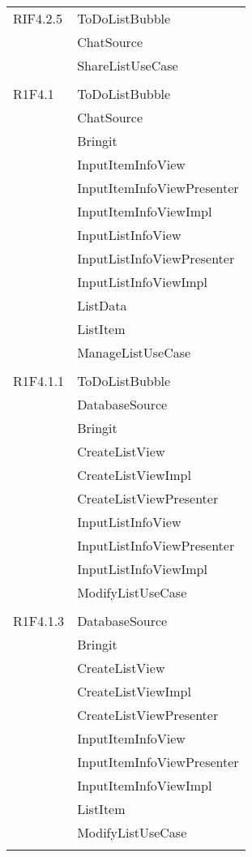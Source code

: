 \begin{center}
\begin{longtable}{|p{7cm}|p{7cm}|}
		RIF4.2.5 & ToDoListBubble \\ & ChatSource \\ & ShareListUseCase \\ & \\ \hline
		R1F4.1 & ToDoListBubble \\ & ChatSource \\ & Bringit \\ & InputItemInfoView \\ & InputItemInfoViewPresenter \\ & InputItemInfoViewImpl \\ & InputListInfoView \\ & InputListInfoViewPresenter \\ & InputListInfoViewImpl \\ & ListData \\ & ListItem \\ & ManageListUseCase \\ & \\ \hline
		R1F4.1.1 & ToDoListBubble \\ & DatabaseSource \\ & Bringit \\ & CreateListView \\ & CreateListViewImpl \\ & CreateListViewPresenter \\ & InputListInfoView \\ & InputListInfoViewPresenter \\ & InputListInfoViewImpl \\ & ModifyListUseCase \\ & \\ \hline
		R1F4.1.3 & DatabaseSource \\ & Bringit \\ & CreateListView \\ & CreateListViewImpl \\ & CreateListViewPresenter \\ & InputItemInfoView \\ & InputItemInfoViewPresenter \\ & InputItemInfoViewImpl \\ & ListItem \\ & ModifyListUseCase \\ & \\ \hline

\end{longtable}
\end{center}
